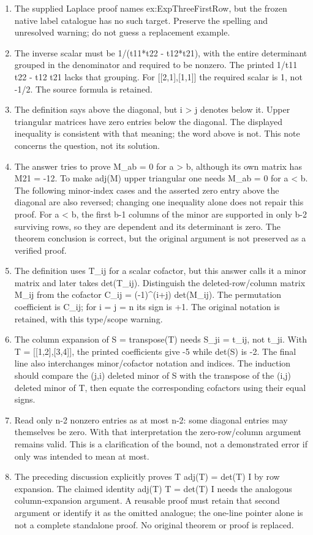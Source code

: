 \begin{enumerate}
\item The supplied Laplace proof names ex:ExpThreeFirstRow, but the frozen native label catalogue has no such target. Preserve the spelling and unresolved warning; do not guess a replacement example.
\item The inverse scalar must be 1/(t11*t22 - t12*t21), with the entire determinant grouped in the denominator and required to be nonzero. The printed 1/t11 t22 - t12 t21 lacks that grouping. For [[2,1],[1,1]] the required scalar is 1, not -1/2. The source formula is retained.
\item The definition says above the diagonal, but i > j denotes below it. Upper triangular matrices have zero entries below the diagonal. The displayed inequality is consistent with that meaning; the word above is not. This note concerns the question, not its solution.
\item The answer tries to prove M\_ab = 0 for a > b, although its own matrix has M21 = -12. To make adj(M) upper triangular one needs M\_ab = 0 for a < b. The following minor-index cases and the asserted zero entry above the diagonal are also reversed; changing one inequality alone does not repair this proof. For a < b, the first b-1 columns of the minor are supported in only b-2 surviving rows, so they are dependent and its determinant is zero. The theorem conclusion is correct, but the original argument is not preserved as a verified proof.
\item The definition uses T\_ij for a scalar cofactor, but this answer calls it a minor matrix and later takes det(T\_ij). Distinguish the deleted-row/column matrix M\_ij from the cofactor C\_ij = (-1)\textasciicircum{}(i+j) det(M\_ij). The permutation coefficient is C\_ij; for i = j = n its sign is +1. The original notation is retained, with this type/scope warning.
\item The column expansion of S = transpose(T) needs S\_ji = t\_ij, not t\_ji. With T = [[1,2],[3,4]], the printed coefficients give -5 while det(S) is -2. The final line also interchanges minor/cofactor notation and indices. The induction should compare the (j,i) deleted minor of S with the transpose of the (i,j) deleted minor of T, then equate the corresponding cofactors using their equal signs.
\item Read only n-2 nonzero entries as at most n-2: some diagonal entries may themselves be zero. With that interpretation the zero-row/column argument remains valid. This is a clarification of the bound, not a demonstrated error if only was intended to mean at most.
\item The preceding discussion explicitly proves T adj(T) = det(T) I by row expansion. The claimed identity adj(T) T = det(T) I needs the analogous column-expansion argument. A reusable proof must retain that second argument or identify it as the omitted analogue; the one-line pointer alone is not a complete standalone proof. No original theorem or proof is replaced.
\end{enumerate}

